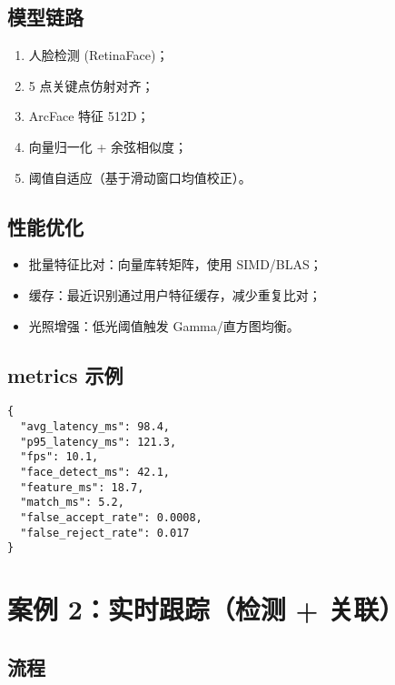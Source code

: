 \subsection{模型链路}\label{ux6a21ux578bux94feux8def}

\begin{enumerate}
\def\labelenumi{\arabic{enumi}.}
\tightlist
\item
  人脸检测 (RetinaFace)；
\item
  5 点关键点仿射对齐；
\item
  ArcFace 特征 512D；
\item
  向量归一化 + 余弦相似度；
\item
  阈值自适应（基于滑动窗口均值校正）。
\end{enumerate}

\subsection{性能优化}\label{ux6027ux80fdux4f18ux5316}

\begin{itemize}
\tightlist
\item
  批量特征比对：向量库转矩阵，使用 SIMD/BLAS；
\item
  缓存：最近识别通过用户特征缓存，减少重复比对；
\item
  光照增强：低光阈值触发 Gamma/直方图均衡。
\end{itemize}

\subsection{metrics 示例}\label{metrics-ux793aux4f8b}

\begin{lstlisting}
{
  "avg_latency_ms": 98.4,
  "p95_latency_ms": 121.3,
  "fps": 10.1,
  "face_detect_ms": 42.1,
  "feature_ms": 18.7,
  "match_ms": 5.2,
  "false_accept_rate": 0.0008,
  "false_reject_rate": 0.017
}
\end{lstlisting}

\section{案例 2：实时跟踪（检测 +
关联）}\label{ux6848ux4f8b-2ux5b9eux65f6ux8ddfux8e2aux68c0ux6d4b-ux5173ux8054}

\subsection{流程}\label{ux6d41ux7a0b}


